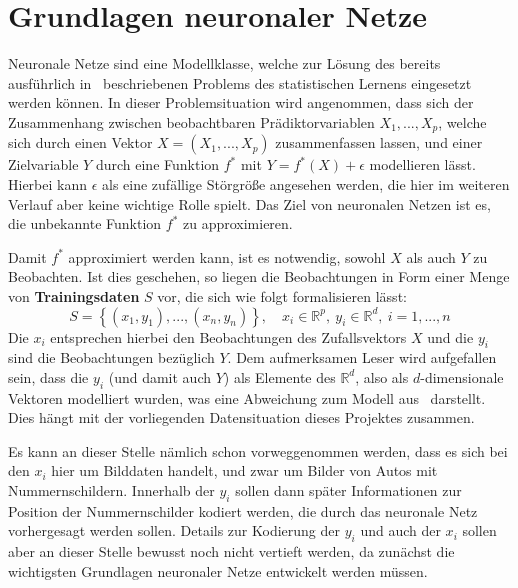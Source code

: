 \section{Grundlagen neuronaler Netze}
\label{sec:neuronale-netze}

Neuronale Netze sind eine Modellklasse, welche zur L\"osung des
bereits ausf\"uhrlich
in~\cite{statistical_learning} beschriebenen Problems des statistischen
Lernens eingesetzt werden k\"onnen.
In dieser Problemsituation wird angenommen, dass sich der Zusammenhang zwischen
beobachtbaren Pr\"adiktorvariablen $X_1, ..., X_p$, welche sich durch
einen Vektor $X = (X_1, ..., X_p)$ zusammenfassen lassen, und einer
Zielvariable $Y$ durch eine Funktion $f^*$ mit $Y = f^*(X) + \epsilon$
modellieren l\"asst. Hierbei kann $\epsilon$ als eine zuf\"allige
St\"orgr\"o{\ss}e angesehen werden, die hier im weiteren Verlauf aber
keine wichtige Rolle spielt.
Das Ziel von neuronalen Netzen ist es, die unbekannte Funktion $f^*$
zu approximieren.

Damit $f^*$ approximiert werden kann, ist es notwendig, sowohl $X$
als auch $Y$ zu Beobachten. Ist dies geschehen, so liegen die
Beobachtungen in Form einer Menge von \textbf{Trainingsdaten}
$S$ vor, die sich wie folgt formalisieren l\"asst:
\begin{equation}
    \label{eq:trainingsdaten}
    S = \left\{ (x_1, y_1), ..., (x_n, y_n) \right\},
    \quad x_i \in \mathbb{R}^p, \  y_i \in \mathbb{R}^d, \  i=1, ..., n
\end{equation}
Die $x_i$ entsprechen hierbei den Beobachtungen des Zufallsvektors $X$
und die $y_i$ sind die Beobachtungen bez\"uglich $Y$.
Dem aufmerksamen Leser wird aufgefallen sein, dass die $y_i$ (und damit auch $Y$)
als Elemente des $\mathbb{R}^d$, also als $d$-dimensionale Vektoren
modelliert wurden, was eine Abweichung zum Modell aus~\cite{statistical_learning}
darstellt. Dies h\"angt mit der vorliegenden Datensituation dieses
Projektes zusammen.

Es kann an dieser Stelle n\"amlich schon vorweggenommen werden, dass es sich bei den
$x_i$ hier um Bilddaten handelt, und zwar um Bilder von Autos
mit Nummernschildern. Innerhalb der $y_i$ sollen dann sp\"ater
Informationen zur Position der Nummernschilder kodiert werden,
die durch das neuronale Netz vorhergesagt werden sollen.
Details zur Kodierung der $y_i$ und auch der $x_i$ sollen aber
an dieser Stelle bewusst noch
nicht vertieft werden, da zun\"achst die wichtigsten Grundlagen neuronaler
Netze entwickelt werden m\"ussen.


